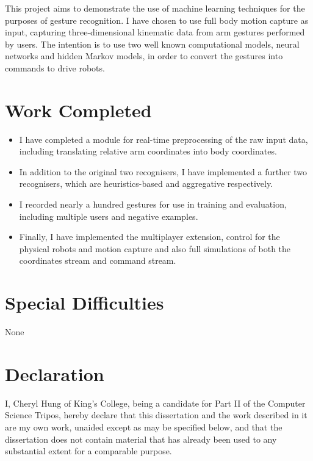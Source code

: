 \documentclass[12pt,a4,notitlepage]{report}
\renewcommand{\_}{\texttt{\symbol{95}}}
\newcommand{\<}{\texttt{\symbol{60}}}
\renewcommand{\>}{\texttt{\symbol{62}}}
\begin{document}
This project aims to demonstrate the use of machine learning techniques for the purposes of gesture recognition. I have chosen to use full body motion capture as input, capturing three-dimensional kinematic data from arm gestures performed by users. The intention is to use two well known computational models, neural networks and hidden Markov models, in order to convert the gestures into commands to drive robots.

\section*{Work Completed}

\begin{itemize}
\item I have completed a module for real-time preprocessing of the raw input data, including translating relative arm coordinates into body coordinates.
\item In addition to the original two recognisers, I have implemented a further two recognisers, which are heuristics-based and aggregative respectively.
\item I recorded nearly a hundred gestures for use in training and evaluation, including multiple users and negative examples.
\item Finally, I have implemented the multiplayer extension, control for the physical robots and motion capture and also full simulations of both the coordinates stream and command stream.
\end{itemize}

\section*{Special Difficulties}

None
 
\newpage
\section*{Declaration}

I, Cheryl Hung of King's College, being a candidate for Part II of the Computer Science Tripos, hereby declare that this dissertation and the work described in it are my own work, unaided except as may be specified below, and that the dissertation does not contain material that has already been used to any substantial extent for a comparable purpose.

\bigskip
{}

\medskip
{}
\end{document}
